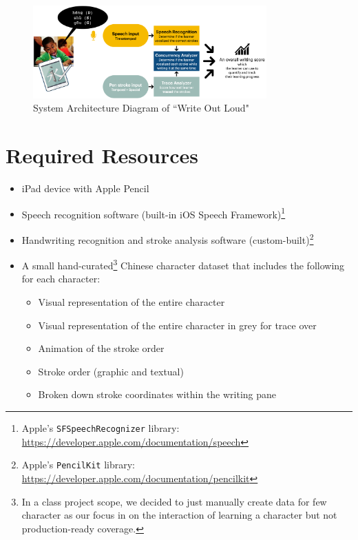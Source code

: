 \documentclass{article}
\begin{document}
\begin{figure}[h!]
\centering
\includegraphics[width=0.8\textwidth]{Assets/SystemDiagram.png}
\caption{System Architecture Diagram of ``Write Out Loud"}
\label{fig:system}
\end{figure}

\section*{Required Resources}
\begin{itemize}
    \item iPad device with Apple Pencil
    \item Speech recognition software (built-in iOS Speech Framework)\footnote{Apple's \texttt{SFSpeechRecognizer} library: \href{https://developer.apple.com/documentation/speech}{https://developer.apple.com/documentation/speech}}
    \item Handwriting recognition and stroke analysis software (custom-built)\footnote{
    Apple's \texttt{PencilKit} library: \href{https://developer.apple.com/documentation/pencilkit}{https://developer.apple.com/documentation/pencilkit}}
    \item A small hand-curated\footnote{In a class project scope, we decided to just manually create data for few character as our focus in on the interaction of learning a character but not production-ready coverage.} Chinese character dataset that includes the following for each character:
    \begin{itemize}
        \item Visual representation of the entire character
        \item Visual representation of the entire character in grey for trace over
        \item Animation of the stroke order
        \item Stroke order (graphic and textual)
        \item Broken down stroke coordinates within the writing pane
    \end{itemize}
\end{itemize}
\end{document}
